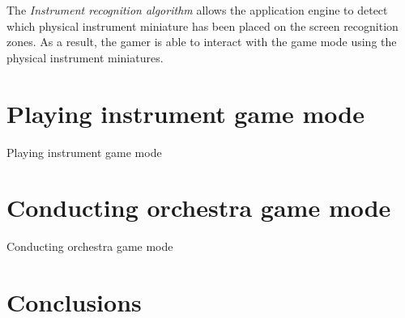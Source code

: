 The \textit{Instrument recognition algorithm} allows the application engine to detect which physical instrument miniature has been placed on the screen recognition zones. As a result, the gamer is able to interact with the game mode using the physical instrument miniatures.

\newpage
\section{Playing instrument game mode}
\label{sec:playinginstrumentgm}

Playing instrument game mode

\newpage
\section{Conducting orchestra game mode}
\label{sec:conductingorchestragm}

Conducting orchestra game mode

\newpage
\section{Conclusions}

